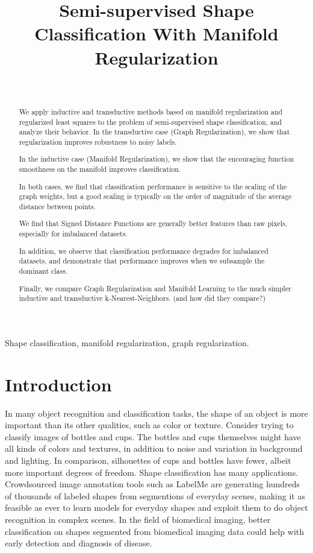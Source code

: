 \documentclass[anon,11pt]{9520} %
\title[Shape Classication]{Semi-supervised Shape Classification With Manifold Regularization}
\author{\Name{Stanislav Nikolov} \Email{snikolov@mit.edu}\\
 }
\begin{document}
\maketitle

\begin{abstract}
We apply inductive and transductive methods based on manifold regularization and regularized least squares to the problem of semi-supervised shape classification, and analyze their behavior. In the transductive case (Graph Regularization), we show that regularization improves robustness to noisy labels. 

In the inductive case (Manifold Regularization), we show that the encouraging function smoothness on the manifold improves classification. 

In both cases, we find that classification performance is sensitive to the scaling of the graph weights, but a good scaling is typically on the order of magnitude of the average distance between points.

We find that Signed Distance Functions are generally better features than raw pixels, especially for imbalanced datasets.

In addition, we observe that classification performance degrades for imbalanced datasets, and demonstrate that performance improves when we subsample the dominant class. 

Finally, we compare Graph Regularization and Manifold Learning to the much simpler inductive and transductive k-Nearest-Neighbors.
(and how did they compare?)
\end{abstract}

\begin{keywords}
Shape classification, manifold regularization, graph regularization.
\end{keywords}

\section{Introduction}

In many object recognition and classification tasks, the shape of an object is more important than its other qualities, such as color or texture. Consider trying to classify images of bottles and cups. The bottles and cups themselves might have all kinds of colors and textures, in addition to noise and variation in background and lighting. In comparison, silhouettes of cups and bottles have fewer, albeit more important degrees of freedom. Shape classification has many applications. Crowdsourced image annotation tools such as LabelMe \cite{LabelMe} are generating hundreds of thousands of labeled shapes from segmentions of everyday scenes, making it as feasible as ever to learn models for everyday shapes and exploit them to do object recognition in complex scenes. In the field of biomedical imaging, better classification on shapes segmented from biomedical imaging data could help with early detection and diagnosis of disease.
\end{document}
